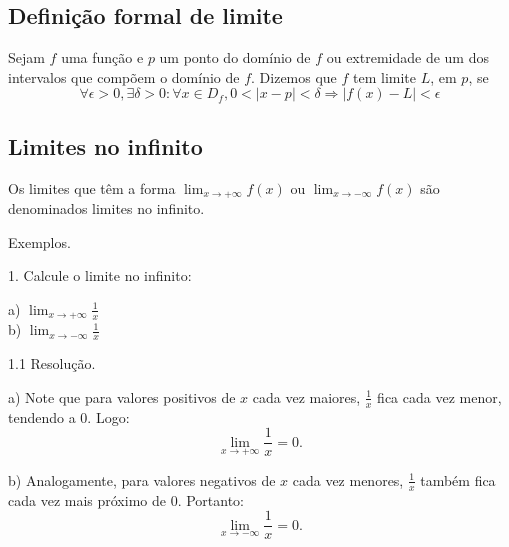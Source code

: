 \documentclass{article}
\begin{document}
{\begin{newpage}
\subsection{Definição formal de limite}
\hspace{12pt} Sejam $f$ uma função e $p$ um ponto do domínio de $f$ ou extremidade de um dos intervalos que compõem o domínio de $f$. Dizemos que $f$ tem limite $L$, em $p$, se
\begin{equation*}\displaystyle{\forall \epsilon > 0, \exists\delta > 0 : \forall x\in D_f , 0 < |x-p| < \delta \Rightarrow |f(x) - L| <  \epsilon }\end{equation*}
\par
\vspace{0.3cm} 
\subsection{Limites no infinito}
\par\hspace{12pt} Os limites que têm a forma $\displaystyle{\lim_{x\to +\infty }} f(x)$ ou $\displaystyle{\lim_{x\to -\infty }} f(x)$ são denominados limites no infinito.
\par
\vspace{0.3cm}
Exemplos.
\par
\begin{flushleft}
1. Calcule o limite no infinito:
\end{flushleft}
\par
\begin{multicols}{2}
a) $\displaystyle{\lim_{x\to +\infty }} \frac{1}{x}$\\
b) $\displaystyle{\lim_{x\to -\infty }} \frac{1}{x}$
\end{multicols}            
\par
\vspace{0.3cm}
\begin{flushleft}
1.1 Resolução.
\end{flushleft}
\par
a) Note que para valores positivos de $x$ cada vez maiores, $\displaystyle{\frac{1}{x}}$ fica cada vez menor, tendendo a 0. Logo:
$$\displaystyle{\lim_{x\to +\infty }} \frac{1}{x} = 0.$$
\par
\vspace{0.3cm}
b) Analogamente, para valores negativos de $x$ cada vez menores, $\displaystyle{\frac{1}{x}}$ também fica cada vez mais próximo de 0. Portanto:
$$\displaystyle{\lim_{x\to -\infty }} \frac{1}{x} = 0.$$
\par

\end{newpage}}
\end{document}
